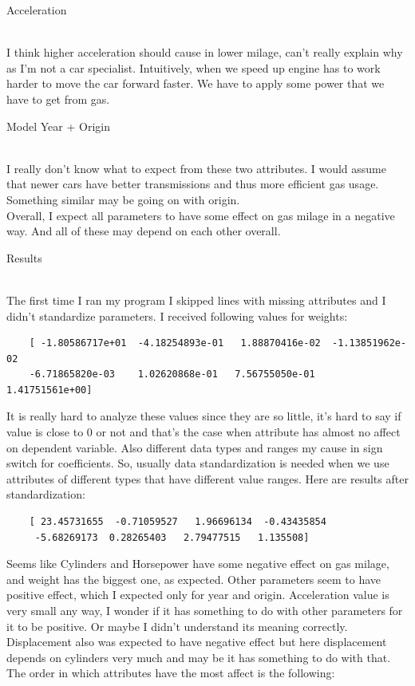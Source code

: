 \documentclass[12pt, letterpaper]{article}
\begin{document}
\begin{enumerate}[label=\Roman*.]
\begin{itemize}
		{\bf \item Acceleration} \\
		I think higher acceleration should cause in lower milage, can't really explain why as I'm not a car  specialist. Intuitively,  when we speed up engine has to work harder to move the car forward faster. We have to apply some power that we have to get from gas.\\
		
		{\bf \item Model Year + Origin} \\
		I really don't know what to expect from these two attributes. I would assume that newer cars have better  transmissions and thus more efficient gas usage. Something similar may be going on with origin. \\
		Overall, I expect all parameters to have some effect on gas milage in a negative way. And all of these may depend on each other overall. 
		
	\end{itemize}
	
	{\bf \item Results} \\
	
	The first time I ran my program I skipped lines with missing attributes and I didn't standardize parameters. I received following values for weights:
	\begin{verbatim}
	[ -1.80586717e+01  -4.18254893e-01   1.88870416e-02  -1.13851962e-02
  	-6.71865820e-03    1.02620868e-01   7.56755050e-01   1.41751561e+00]
	\end{verbatim}
	It is really hard to analyze these values since they are so little, it's hard to say if value is close to 0 or not and that's the case when attribute has almost no affect on dependent variable. Also different data types and ranges my cause in sign switch for coefficients. So, usually data standardization is needed when we use attributes of different types that have different value ranges. Here are results after standardization:
	\begin{verbatim}
	[ 23.45731655  -0.71059527   1.96696134  -0.43435854  
	 -5.68269173  0.28265403   2.79477515   1.135508]
	\end{verbatim}
	
	Seems like Cylinders and Horsepower have some negative effect on gas milage, and weight has the biggest one, as expected. Other parameters seem to have positive effect, which I expected only for year and origin. Acceleration value is very small any way, I wonder if it has something to do with other parameters for it to be positive. Or maybe I didn't understand its meaning correctly.  Displacement also was expected to have negative effect but here displacement depends on cylinders very much and may be it has something to do with that. The order in which attributes have the most affect is the following:\\
	

\end{enumerate}
\end{document}
